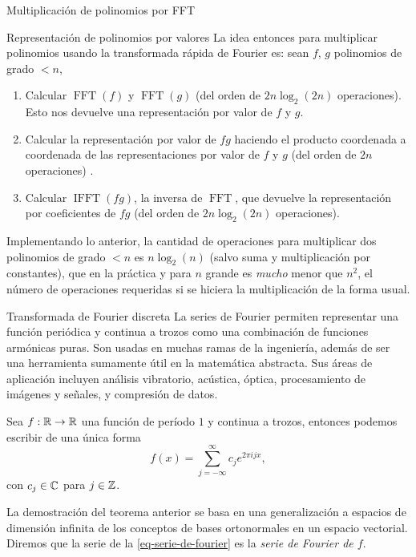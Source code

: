 \begin{chapter}{Multiplicación de polinomios por FFT}
\begin{section}{Representación de polinomios por valores}
        La idea entonces para multiplicar polinomios usando la transformada rápida de Fourier es:  sean $f$, $g$ polinomios de grado $<n$,
        \begin{enumerate}
            \item Calcular $\operatorname{FFT}(f)$ y $\operatorname{FFT}(g)$ (del orden de $2n\operatorname{log}_2(2n)$ operaciones). Esto nos devuelve una representación por valor de $f$ y $g$.
            \item Calcular  la representación por valor de $fg$ haciendo el producto coordenada a coordenada de las representaciones por valor de $f$ y $g$ (del orden de $2n$ operaciones)  .
            \item Calcular $\operatorname{IFFT}(fg)$, la inversa de $\operatorname{FFT}$, que devuelve la representación por coeficientes de $fg$ (del orden de $2n\operatorname{log}_2(2n)$ operaciones).
        \end{enumerate}

        Implementando lo anterior, la cantidad de operaciones para multiplicar dos polinomios de grado $<n$  es $n \log_2(n)$ (salvo suma y multiplicación por constantes), que en la práctica y para $n$ grande es \textit{mucho} menor que $n^2$, el número de operaciones requeridas si se hiciera la multiplicación de la forma usual. 

    \end{section}

    \begin{section}{Transformada de Fourier discreta} La series de Fourier permiten representar una función periódica y continua a trozos como una combinación de funciones armónicas puras. Son usadas en muchas ramas de la ingeniería, además de ser una herramienta sumamente útil en la matemática abstracta. Sus áreas de aplicación incluyen análisis vibratorio, acústica, óptica, procesamiento de imágenes y señales, y compresión de datos. 

        \begin{teorema}\label{th-series-de-fourier}
            Sea $f: \mathbb R \to \mathbb R$ una función de período $1$ y continua a trozos, entonces podemos escribir de una única forma
            \begin{equation}\label{eq-serie-de-fourier}
                f(x) = \sum_{ j= -\infty}^\infty c_j e^{2\pi ijx},
            \end{equation}
            con $c_j \in \mathbb C$ para $j \in \mathbb Z$.
        \end{teorema}
        La demostración del teorema anterior se basa en una generalización a espacios de dimensión infinita de los conceptos de bases ortonormales en un espacio vectorial. Diremos que la serie de la \eqref{eq-serie-de-fourier} es la \textit{serie de Fourier de $f$}. 


\end{section}
\end{chapter}
